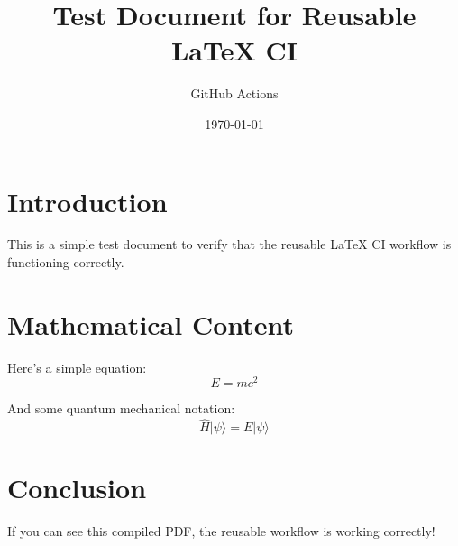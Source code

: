 \documentclass{article}
\title{Test Document for Reusable LaTeX CI}
\author{GitHub Actions}
\date{\today}
\begin{document}
\maketitle

\section{Introduction}

This is a simple test document to verify that the reusable LaTeX CI workflow is functioning correctly.

\section{Mathematical Content}

Here's a simple equation:
\begin{equation}
    E = mc^2
\end{equation}

And some quantum mechanical notation:
\begin{equation}
    \hat{H}|\psi\rangle = E|\psi\rangle
\end{equation}

\section{Conclusion}

If you can see this compiled PDF, the reusable workflow is working correctly!
\end{document}
